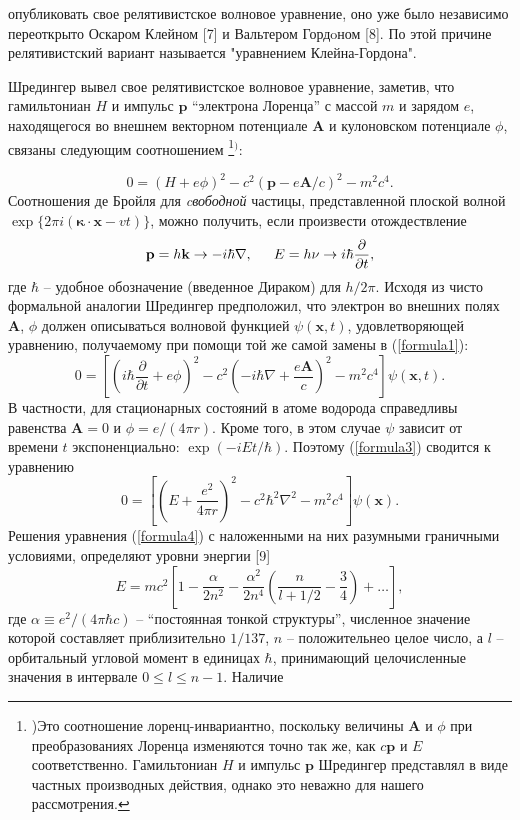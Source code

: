 \documentclass[a5paper,8pt]{article}
\begin{document}
\sloppy
\pagestyle{fancy}
\noindent
опубликовать свое релятивистское волновое уравнение, оно уже было независимо переоткрыто Оскаром Клейном [7] и Вальтером Гордoном  [8]. По этой причине релятивистский вариант называется "уравнением Клейна-Гордона".

Шредингер вывел свое релятивистское волновое уравнение, заметив, что гамильтониан $H$ и импульс $\mathbf{p}$ ``электрона Лоренца'' с массой $m$ и зарядом $e$, находящегося во внешнем векторном потенциале $\mathbf{A}$ и кулоновском потенциале $\phi$, связаны следующим соотношением \footnote{)Это соотношение лоренц-инвариантно, поскольку величины $\mathbf{A}$ и $\phi$ при преобразованиях Лоренца изменяются точно так же, как $c \mathbf{p}$ и $E$ соответственно. Гамильтониан $H$ и импульс $\mathbf{p}$ Шредингер представлял в виде частных производных действия, однако это неважно для нашего рассмотрения.}$^)$:

\begin{equation}
\label{formula1}
0 = (H + e\phi )^2 - c^2 (\mathbf{p} - e\mathbf{A}/c)^2 - m^2 c^4 .
\end{equation}
\noindent
Соотношения де Бройля для \textit{cвободной} частицы, представленной плоской волной $\exp\{2 \pi i(\boldsymbol{\kappa}\cdot\textbf{x}-v t)\} $, можно получить, если произвести отождествление
\begin{equation}
\label{formula2}
\textbf{p} = h\textbf{k}\rightarrow -i\hbar\nabla,\indent E=h\nu \rightarrow i\hbar \frac{\partial}{\partial t},
\end{equation}
\noindent
где $\hbar$ -- удобное обозначение (введенное Дираком) для $h/2\pi$. Исходя из чисто формальной аналогии Шредингер предположил, что электрон во внешних полях \textbf{A}, $\phi$ должен описываться волновой функцией $\psi(\mathbf{x}, t)$, удовлетворяющей уравнению, получаемому при помощи той же самой замены в (\ref{formula1}):
\begin{equation}
\label{formula3}
0 = \left[\left(i\hbar\frac{\partial}{\partial t} + e\phi\right)^2 - c^2\left(-i\hbar\nabla +\frac{e\mathbf{A}}{c}\right)^2 - m^2 c^4\right]\psi(\mathbf{x}, t) .
\end{equation}
В частности, для стационарных состояний в атоме водорода справедливы равенства $\mathbf{A} = 0$ и $\phi = e/(4\pi r)$. Кроме того, в этом случае $\psi$ зависит от времени $t$ экспоненциально: $\exp(-iEt/\hbar)$. Поэтому (\ref{formula3}) сводится к уравнению
\begin{equation}
\label{formula4}
0 = \left[\left(E +\frac{e^2}{4\pi r}\right)^2 - c^2\hbar^2\nabla^2 - m^2 c^4\right]\psi(\mathbf{x}) .
\end{equation}
Решения уравнения (\ref{formula4}) с наложенными на них разумными граничными условиями, определяют уровни энергии [9]
\begin{equation}
\label{formula5}
E = m c^2 \left[1 - \frac{\alpha}{2 n^2} - \frac{\alpha^2}{2 n^4} \left(\frac{n}{l + 1/2} - \frac{3}{4}\right) + \ldots\right],
\end{equation}
где $\alpha\equiv e^2 /(4\pi\hbar c)$ -- ``постоянная тонкой структуры'', численное значение которой составляет приблизительно $1/137$, $n$ -- положительнео целое число, а $l$ -- орбитальный угловой момент в единицах $\hbar$, принимающий целочисленные значения в интервале $0\le l\le n - 1$. Наличие
\end{document}
